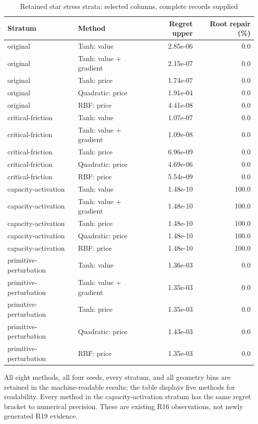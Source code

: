 \begin{table}[p]
\centering
\caption{Retained star stress strata: selected columns, complete records supplied}\label{tab:r19-star}
\setlength{\tabcolsep}{4pt}
\begin{tabular}{llrr}
\toprule
Stratum & Method & Regret upper & Root repair (\%) \\
\midrule
original & Tanh: value & 2.85e-06 & 0.0 \\
original & Tanh: value + gradient & 2.15e-07 & 0.0 \\
original & Tanh: price & 1.74e-07 & 0.0 \\
original & Quadratic: price & 1.91e-04 & 0.0 \\
original & RBF: price & 4.41e-08 & 0.0 \\
critical-friction & Tanh: value & 1.07e-07 & 0.0 \\
critical-friction & Tanh: value + gradient & 1.09e-08 & 0.0 \\
critical-friction & Tanh: price & 6.96e-09 & 0.0 \\
critical-friction & Quadratic: price & 4.69e-06 & 0.0 \\
critical-friction & RBF: price & 5.54e-09 & 0.0 \\
capacity-activation & Tanh: value & 1.48e-10 & 100.0 \\
capacity-activation & Tanh: value + gradient & 1.48e-10 & 100.0 \\
capacity-activation & Tanh: price & 1.48e-10 & 100.0 \\
capacity-activation & Quadratic: price & 1.48e-10 & 100.0 \\
capacity-activation & RBF: price & 1.48e-10 & 100.0 \\
primitive-perturbation & Tanh: value & 1.36e-03 & 0.0 \\
primitive-perturbation & Tanh: value + gradient & 1.35e-03 & 0.0 \\
primitive-perturbation & Tanh: price & 1.35e-03 & 0.0 \\
primitive-perturbation & Quadratic: price & 1.43e-03 & 0.0 \\
primitive-perturbation & RBF: price & 1.35e-03 & 0.0 \\
\bottomrule
\end{tabular}

\par\medskip\begin{minipage}{\textwidth}All eight methods, all four seeds, every stratum, and all geometry bins are retained in the machine-readable results; the table displays five methods for readability. Every method in the capacity-activation stratum has the same regret bracket to numerical precision. These are existing R16 observations, not newly generated R19 evidence.\end{minipage}
\end{table}
